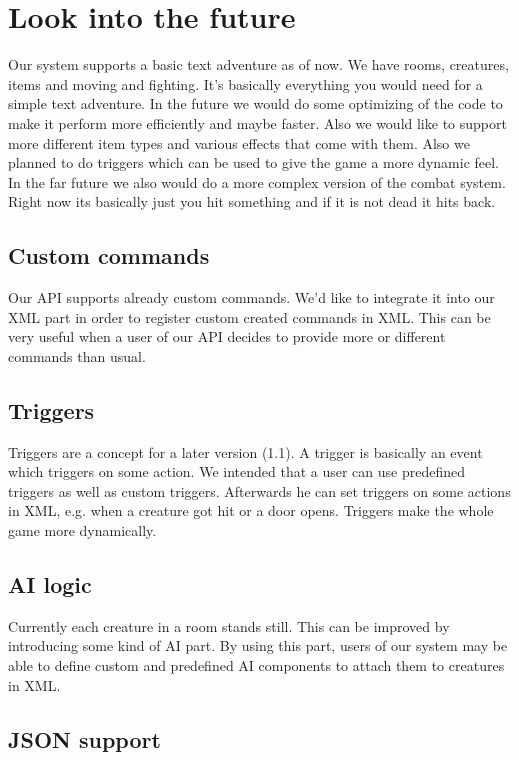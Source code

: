 \chapter{Look into the future}
Our system supports a basic text adventure as of now. We have rooms, creatures, items and moving and fighting. It's basically everything you would need for a simple text adventure. In the future we would do some optimizing of the code to make it perform more efficiently and maybe faster. Also we would like to support more different item types and various effects that come with them. 
Also we planned to do triggers which can be used to give the game a more dynamic feel. In the far future we also would do a more complex version of the combat system. Right now its basically just you hit something and if it is not dead it hits back.

\section{Custom commands}

Our API supports already custom commands. We'd like to integrate it into our XML part in order to register custom created commands in XML. This can be very useful when a user of our API decides to provide more or different commands than usual.

\section{Triggers}

Triggers are a concept for a later version (1.1). A trigger is basically an event which triggers on some action. We intended that a user can use predefined triggers as well as custom triggers. Afterwards he can set triggers on some actions in XML, e.g. when a creature got hit or a door opens. Triggers make the whole game more dynamically.

\section{AI logic}

Currently each creature in a room stands still. This can be improved by introducing some kind of AI part. By using this part, users of our system may be able to define custom and predefined AI components to attach them to creatures in XML.

\section{JSON support}

